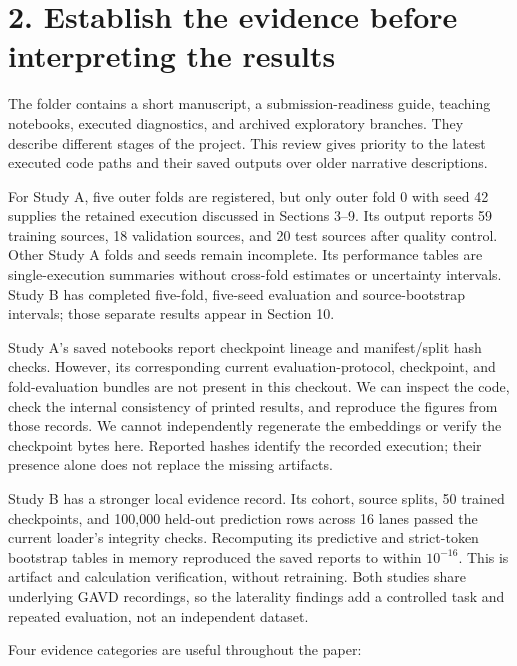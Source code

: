 \documentclass[11pt,letterpaper]{article}
\begin{document}
\section{2. Establish the evidence before interpreting the
results}\label{establish-the-evidence-before-interpreting-the-results}

The folder contains a short manuscript, a submission-readiness guide,
teaching notebooks, executed diagnostics, and archived exploratory
branches. They describe different stages of the project. This review
gives priority to the latest executed code paths and their saved outputs
over older narrative descriptions.

For Study A, five outer folds are registered, but only outer fold 0 with
seed 42 supplies the retained execution discussed in Sections 3--9. Its
output reports 59 training sources, 18 validation sources, and 20 test
sources after quality control. Other Study A folds and seeds remain
incomplete. Its performance tables are single-execution summaries
without cross-fold estimates or uncertainty intervals. Study B has
completed five-fold, five-seed evaluation and source-bootstrap
intervals; those separate results appear in Section 10.

Study A's saved notebooks report checkpoint lineage and manifest/split
hash checks. However, its corresponding current evaluation-protocol,
checkpoint, and fold-evaluation bundles are not present in this
checkout. We can inspect the code, check the internal consistency of
printed results, and reproduce the figures from those records. We cannot
independently regenerate the embeddings or verify the checkpoint bytes
here. Reported hashes identify the recorded execution; their presence
alone does not replace the missing artifacts.

Study B has a stronger local evidence record. Its cohort, source splits,
50 trained checkpoints, and 100,000 held-out prediction rows across 16
lanes passed the current loader's integrity checks. Recomputing its
predictive and strict-token bootstrap tables in memory reproduced the
saved reports to within \(10^{-16}\). This is artifact and calculation
verification, without retraining. Both studies share underlying GAVD
recordings, so the laterality findings add a controlled task and
repeated evaluation, not an independent dataset.

Four evidence categories are useful throughout the paper:
\end{document}
